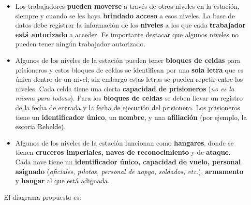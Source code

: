 \documentclass{article}
\begin{document}
\begin{enumerate}[label = (\alph*)]
{\begin{itemize}
{                    la \textbf{capacidad de almacenamiento}, y si se trata de un 
                    \textbf{nivel restringido o no}. Todos los niveles tienen 
                    \textbf{viviendas} con capacidad de alojar a varios 
                    trabajadores, y a todos los trabajadores se les asignan 
                    viviendas de la estación.
                }
                \item {
                    Los trabajadores \textbf{pueden moverse} a través de otros 
                    niveles en la estación, siempre y cuando se les haya 
                    \textbf{brindado acceso} a esos niveles. La base de datos 
                    debe registrar la información de los \textbf{niveles} a los 
                    que cada \textbf{trabajador está autorizado} a acceder. Es 
                    importante destacar que algunos niveles no pueden tener 
                    ningún trabajador autorizado.
                }
                \item {
                    Algunos de los niveles de la estación pueden tener 
                    \textbf{bloques de celdas} para prisioneros y estos bloques
                    de celdas se identifican por una \textbf{sola letra} que es 
                    única dentro de un nivel; sin embargo estas letras se pueden
                    repetir entre los niveles. Cada celda tiene una cierta 
                    \textbf{capacidad de prisioneros} (\textit{no es la misma 
                    para todoas}). Para los \textbf{bloques de celdas} se deben
                    llevar un registro de la fecha de entrada y la fecha de 
                    ejecución del prisionero. Los prisioneros tiene un 
                    \textbf{identificador único}, un \textbf{nombre}, y una 
                    \textbf{afiliación} (por ejemplo, la escoria Rebelde).
                }
                \item {
                    Algunos de los niveles de la estación funcionan como 
                    \textbf{hangares}, donde se tienen \textbf{cruceros 
                    imperiales, naves de reconocimiento} y de \textbf{ataque}.
                    Cada nave tiene un \textbf{identificador único, capacidad de
                    vuelo, personal asignado} (\textit{oficiales, pilotos, 
                    personal de aopyo, soldados, etc.}), \textbf{armamento} y 
                    \textbf{hangar} al que está adignada.
                }
            \end{itemize}
            El diagrama propuesto es:
}
\end{enumerate}
\end{document}
